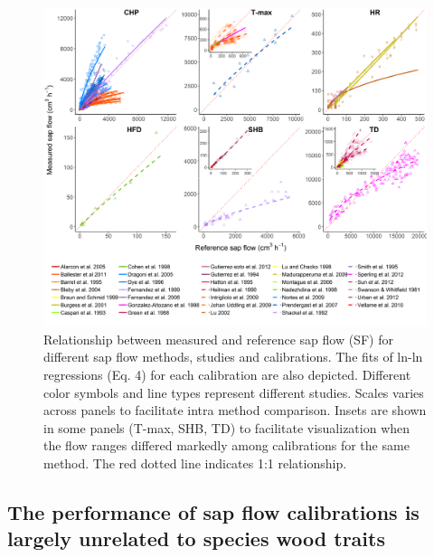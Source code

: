 \documentclass[11pt,twoside]{reedthesis}
\begin{document}
\begin{figure}[p]

{\centering \includegraphics[width=1\linewidth]{figure/CH2/figure-totalflow} 

}

\caption{Relationship between measured and reference sap flow (SF) for different sap flow methods, studies and calibrations. The fits of ln-ln regressions (Eq. 4) for each calibration are also depicted. Different color symbols and line types represent different studies. Scales varies across panels to facilitate intra method comparison. Insets are shown in some panels (T-max, SHB, TD) to facilitate visualization when the flow ranges differed markedly among calibrations for the same method. The red dotted line indicates 1:1 relationship.}\label{fig:ch1fig6}
\end{figure}
\subsection{The performance of sap flow calibrations is largely
unrelated to species wood
traits}\label{the-performance-of-sap-flow-calibrations-is-largely-unrelated-to-species-wood-traits}
\end{document}

